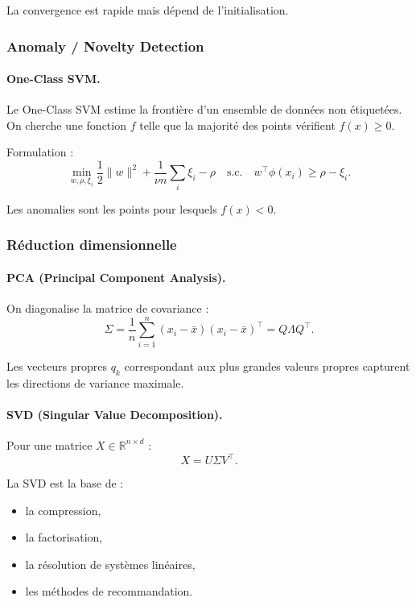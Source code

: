 \documentclass[11pt,a4paper]{article}
\newcommand{\1}{\mathbf{1}}
\begin{document}
La convergence est rapide mais dépend de l'initialisation.

\subsubsection{Anomaly / Novelty Detection}

\paragraph{One-Class SVM.}

Le One-Class SVM estime la frontière d'un ensemble de données non étiquetées.
On cherche une fonction $f$ telle que la majorité des points vérifient $f(x) \ge 0$.

Formulation :
\[
\min_{w,\rho,\xi_i}
\frac12 \|w\|^2 + \frac{1}{\nu n} \sum_i \xi_i - \rho
\quad
\text{s.c.}
\quad
w^\top \phi(x_i) \ge \rho - \xi_i.
\]

Les anomalies sont les points pour lesquels $f(x)<0$.

\subsubsection{Réduction dimensionnelle}

\paragraph{PCA (Principal Component Analysis).}

On diagonalise la matrice de covariance :
\[
\Sigma = \frac{1}{n}\sum_{i=1}^n (x_i - \bar x)(x_i - \bar x)^\top
= Q \Lambda Q^\top.
\]

Les vecteurs propres $q_k$ correspondant aux plus grandes valeurs propres
capturent les directions de variance maximale.

\paragraph{SVD (Singular Value Decomposition).}

Pour une matrice $X \in \mathbb{R}^{n \times d}$ :
\[
X = U \Sigma V^\top.
\]

La SVD est la base de :
\begin{itemize}
  \item la compression,
  \item la factorisation,
  \item la résolution de systèmes linéaires,
  \item les méthodes de recommandation.
\end{itemize}
\end{document}
